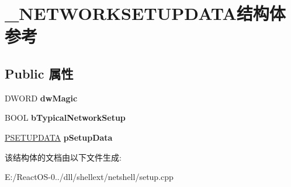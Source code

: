 \hypertarget{struct___n_e_t_w_o_r_k_s_e_t_u_p_d_a_t_a}{}\section{\+\_\+\+N\+E\+T\+W\+O\+R\+K\+S\+E\+T\+U\+P\+D\+A\+T\+A结构体 参考}
\label{struct___n_e_t_w_o_r_k_s_e_t_u_p_d_a_t_a}
\subsection*{Public 属性}
\begin{DoxyCompactItemize}
\item 
\mbox{\label{struct___n_e_t_w_o_r_k_s_e_t_u_p_d_a_t_a_a44f87fd3fb18e9828d91ab0b71c22534}} 
D\+W\+O\+RD {\bfseries dw\+Magic}
\item 
\mbox{\label{struct___n_e_t_w_o_r_k_s_e_t_u_p_d_a_t_a_a2a6c76aba35e73146dae595772d3f9b1}} 
B\+O\+OL {\bfseries b\+Typical\+Network\+Setup}
\item 
\mbox{\label{struct___n_e_t_w_o_r_k_s_e_t_u_p_d_a_t_a_a54d98b8767e74628350fa4683646d954}} 
\hyperlink{struct___s_e_t_u_p_d_a_t_a}{P\+S\+E\+T\+U\+P\+D\+A\+TA} {\bfseries p\+Setup\+Data}
\end{DoxyCompactItemize}


该结构体的文档由以下文件生成\+:\begin{DoxyCompactItemize}
\item 
E\+:/\+React\+O\+S-\/0../dll/shellext/netshell/setup.\+cpp\end{DoxyCompactItemize}
